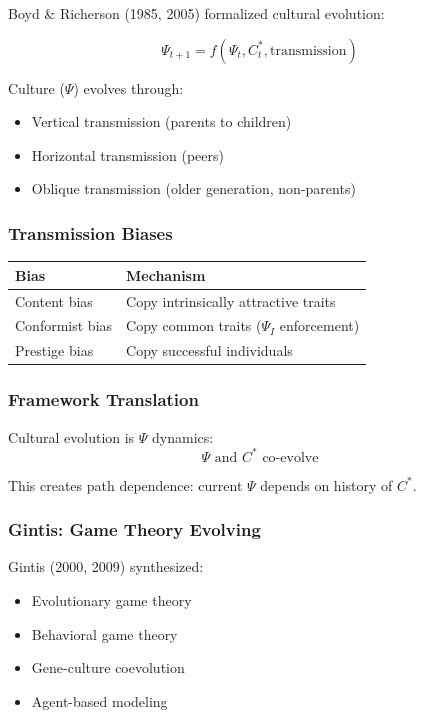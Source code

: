 Boyd \& Richerson (1985, 2005) formalized cultural evolution:

\begin{equation}
\boxed{
\Psi_{t+1} = f(\Psi_t, C^*_t, \text{transmission})
}
\label{eq:cultural-evolution}
\end{equation}

Culture ($\Psi$) evolves through:
\begin{itemize}
    \item Vertical transmission (parents to children)
    \item Horizontal transmission (peers)
    \item Oblique transmission (older generation, non-parents)
\end{itemize}

\subsubsection{Transmission Biases}

\begin{center}
\renewcommand{\arraystretch}{1.3}
\begin{tabular}{|l|l|}
\hline
\textbf{Bias} & \textbf{Mechanism} \\
\hline
Content bias & Copy intrinsically attractive traits \\
Conformist bias & Copy common traits ($\Psi_I$ enforcement) \\
Prestige bias & Copy successful individuals \\
\hline
\end{tabular}
\end{center}

\subsubsection{Framework Translation}

Cultural evolution is $\Psi$ dynamics:
\begin{equation}
\Psi \text{ and } C^* \text{ co-evolve}
\end{equation}

This creates path dependence: current $\Psi$ depends on history of $C^*$.

\subsubsection{Gintis: Game Theory Evolving}

Gintis (2000, 2009) synthesized:
\begin{itemize}
    \item Evolutionary game theory
    \item Behavioral game theory
    \item Gene-culture coevolution
    \item Agent-based modeling
\end{itemize}


